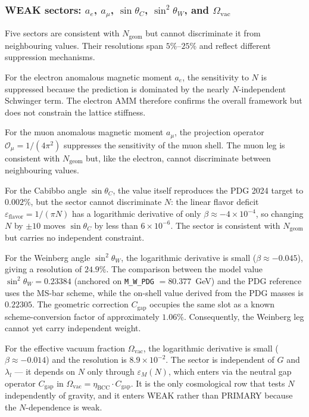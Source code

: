 \documentclass[10pt,a4paper]{article}
\begin{document}
\subsubsection{WEAK sectors: $a_e$, $a_\mu$, $\sin\theta_C$,
	$\sin^2\theta_W$, and $\Omega_{\text{vac}}$}

Five sectors are consistent with $N_{\text{geom}}$ but cannot discriminate
it from neighbouring values. Their resolutions span $5\%$--$25\%$ and
reflect different suppression mechanisms.

For the electron anomalous magnetic moment $a_e$, the sensitivity to $N$
is suppressed because the prediction is dominated by the nearly
$N$-independent Schwinger term. The electron AMM therefore confirms the
overall framework but does not constrain the lattice stiffness.

For the muon anomalous magnetic moment $a_\mu$, the projection operator
$\mathcal{O}_\mu = 1/(4\pi^2)$ suppresses the sensitivity of the muon
shell. The muon leg is consistent with $N_{\text{geom}}$ but, like the
electron, cannot discriminate between neighbouring values.

For the Cabibbo angle $\sin\theta_C$, the value itself reproduces the PDG
2024 target to $0.002\%$, but the sector cannot discriminate $N$: the
linear flavor deficit $\varepsilon_{\text{flavor}} = 1/(\pi N)$ has a
logarithmic derivative of only $\beta \approx -4 \times 10^{-4}$, so
changing $N$ by $\pm 10$ moves $\sin\theta_C$ by less than
$6 \times 10^{-6}$. The sector is consistent with $N_{\text{geom}}$ but
carries no independent constraint.

For the Weinberg angle $\sin^2\theta_W$, the logarithmic derivative is
small ($\beta \approx -0.045$), giving a resolution of $24.9\%$. The
comparison between the model value $\sin^2\theta_W = 0.23384$ (anchored on
\texttt{M\_W\_PDG} $= 80.377$~GeV) and the PDG reference uses the MS-bar
scheme, while the on-shell value derived from the PDG masses is $0.22305$.
The geometric correction $C_{\text{gap}}$ occupies the same slot as a
known scheme-conversion factor of approximately $1.06\%$. Consequently,
the Weinberg leg cannot yet carry independent weight.

For the effective vacuum fraction $\Omega_{\text{vac}}$, the logarithmic
derivative is small ($\beta \approx -0.014$) and the resolution is
$8.9 \times 10^{-2}$. The sector is independent of $G$ and $\lambda_l$
--- it depends on $N$ only through $\varepsilon_M(N)$, which enters via
the neutral gap operator $C_{\text{gap}}$ in
$\Omega_{\text{vac}} = \eta_{\text{BCC}} \cdot C_{\text{gap}}$. It is the
only cosmological row that tests $N$ independently of gravity, and it
enters WEAK rather than PRIMARY because the $N$-dependence is weak.
\end{document}
